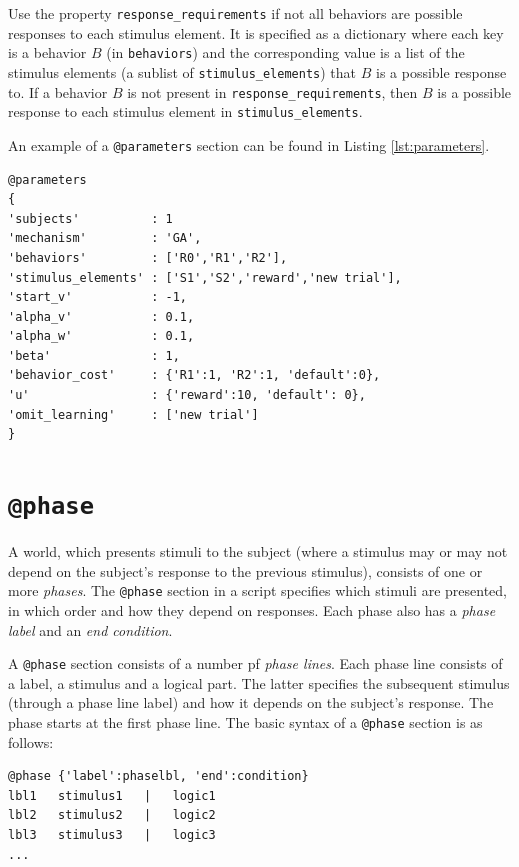 \documentclass[11pt]{article}
\begin{document}
Use the property \verb|response_requirements| if not all behaviors are possible responses to each stimulus element. It is specified as a dictionary where each key is a behavior $B$ (in \verb|behaviors|) and the corresponding value is a list of the stimulus elements (a sublist of \verb|stimulus_elements|) that $B$ is a possible response to. If a behavior $B$ is not present in \verb|response_requirements|, then $B$ is a possible response to each stimulus element in \verb|stimulus_elements|.

\newpage

An example of a \verb|@parameters| section can be found in Listing \ref{lst:parameters}.
\begin{lstlisting}[caption={An example of a \texttt{@parameters} section}, label=lst:parameters]
@parameters
{
'subjects'          : 1
'mechanism'         : 'GA',
'behaviors'         : ['R0','R1','R2'],
'stimulus_elements' : ['S1','S2','reward','new trial'],
'start_v'           : -1,
'alpha_v'           : 0.1,
'alpha_w'           : 0.1,
'beta'              : 1,
'behavior_cost'     : {'R1':1, 'R2':1, 'default':0},
'u'                 : {'reward':10, 'default': 0}, 
'omit_learning'     : ['new trial'] 
}
\end{lstlisting}

\section{\texttt{@phase}}
A world, which presents stimuli to the subject (where a stimulus may or may not depend on the subject's response to the previous stimulus), consists of one or more \emph{phases}. The 
\verb|@phase| section in a script specifies which stimuli are presented, in which order and how they depend on responses. Each phase also has a \emph{phase label} and an \emph{end condition}.

A \verb|@phase| section consists of a number pf \emph{phase lines}. Each phase line consists of a label, a stimulus and a logical part. The latter specifies the subsequent stimulus (through a phase line label) and how it depends on the subject's response. The phase starts at the first phase line. The basic syntax of a \verb|@phase| section is as follows:

\begin{lstlisting}[caption={The basic syntax of a \texttt{@phase} section}]
@phase {'label':phaselbl, 'end':condition}
lbl1   stimulus1   |   logic1
lbl2   stimulus2   |   logic2
lbl3   stimulus3   |   logic3
...
\end{lstlisting}
\end{document}
